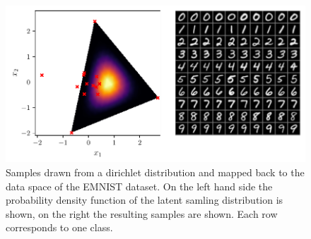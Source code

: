 \begin{figure}[htpb]
	\centering
	\includegraphics[width=1\linewidth]{figures/samples/aa_emnist.pdf}
	\caption{Samples drawn from a dirichlet distribution and mapped back to
		the data space of the EMNIST dataset. On the left hand side the
		probability density function of the latent samling distribution is
		shown, on the right the resulting samples are shown. Each row
		corresponds to one class.}%
	\label{fig:aa_emnist}
\end{figure}

